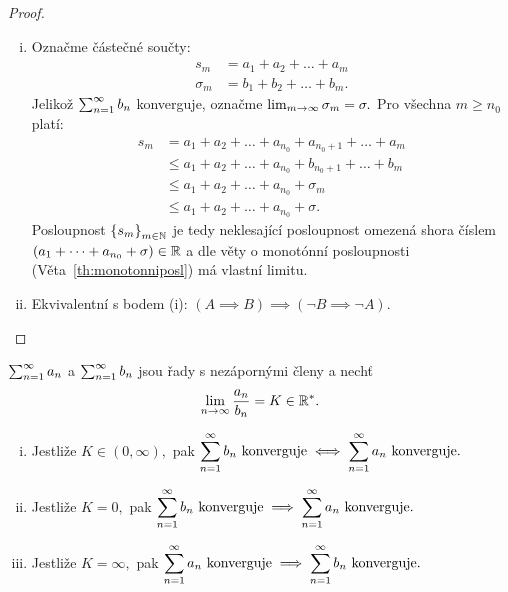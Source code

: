 \begin{proof}
    \leavevmode
    \begin{enumerate}[(i)]
        \item Označme částečné součty:
            \begin{align*}
                s_m &= a_1 + a_2 + \dots + a_m \\
                \sigma_m &= b_1 + b_2 + \dots + b_m.
            \end{align*}
            Jelikož $\sum_{n=1}^\infty b_n$ konverguje, označme $\lim_{m \to \infty} \sigma_m = \sigma.$
            Pro všechna $m \geq n_0$ platí:
            \begin{align*}
                s_m &= a_1 + a_2 + \dots + a_{n_0} + a_{n_0 + 1} + \dots + a_m \\
                    &\leq a_1 + a_2 + \dots + a_{n_0} + b_{n_0 + 1} + \dots + b_m \\
                    &\leq a_1 + a_2 + \dots + a_{n_0} + \sigma_m \\
                    &\leq a_1 + a_2 + \dots + a_{n_0} + \sigma.
            \end{align*}
            Posloupnost $\left\{s_m\right\}_{m \in \mathbb{N}}$ je tedy neklesající posloupnost omezená shora
            číslem $(a_1 + \dots + a_{n_0} + \sigma) \in \mathbb{R}$ a dle věty o monotónní
            posloupnosti (Věta~\ref{th:monotonniposl}) má vlastní limitu.
        \item Ekvivalentní s bodem (i): $(A \implies B) \implies (\lnot B \implies \lnot A).$
    \end{enumerate}
\end{proof}

\begin{theorem}
    \Necht $\sum_{n=1}^\infty a_n$ a $\sum_{n=1}^\infty b_n$ jsou řady s nezápornými členy a nechť
    $$\lim_{n \to \infty} \frac{a_n}{b_n} = K \in \mathbb{R}^*.$$
    \begin{enumerate}[(i)]
        \item Jestliže $K \in (0, \infty),$ pak $\displaystyle \sum_{n=1}^\infty b_n 
            \text{ konverguje} \iff \sum_{n=1}^\infty a_n \text{ konverguje.}$
         \item Jestliže $K = 0,$ pak $\displaystyle \sum_{n=1}^\infty b_n 
            \text{ konverguje} \implies \sum_{n=1}^\infty a_n \text{ konverguje.}$
         \item Jestliže $K = \infty,$ pak $\displaystyle \sum_{n=1}^\infty a_n 
            \text{ konverguje} \implies \sum_{n=1}^\infty b_n \text{ konverguje.}$
    \end{enumerate}
\end{theorem}

